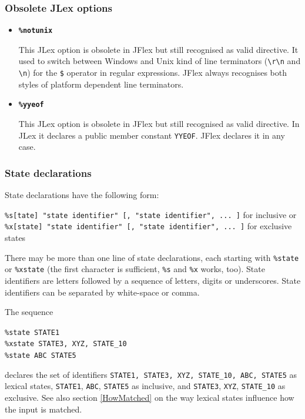 \documentclass[11pt]{scrartcl}
\begin{document}
\subsubsection{Obsolete JLex options}\label{Obsolete}
\begin{itemize}
\item
{\bfseries \texttt{\%notunix}}

This JLex option is obsolete in JFlex but still recognised as valid directive.
It used to switch between Windows and Unix kind of line terminators (\verb+\r\n+
and \verb+\n+) for the \texttt{\$} operator in regular expressions. JFlex
always recognises both styles of platform dependent line terminators.
 
\item
{\bfseries \texttt{\%yyeof}}

This JLex option is obsolete in JFlex but still recognised as valid directive.
In JLex it declares a public member constant \texttt{YYEOF}. JFlex declares it in any case.
\end{itemize}

\subsubsection{State declarations}\label{StateDecl}
State declarations have the following form:

\texttt{\%s[tate] "state identifier" [, "state identifier", ... ]} for inclusive or\\
\texttt{\%x[state] "state identifier" [, "state identifier", ... ]} for exclusive states

There may be more than one line of state declarations, each starting with
\texttt{\%state} or \texttt{\%xstate} (the first character is sufficient,
\texttt{\%s} and \texttt{\%x} works, too). State identifiers are letters followed 
by a sequence of letters, digits or underscores. State identifiers can be separated 
by white-space or comma.

The sequence

\texttt{\%state STATE1}\\
\texttt{\%xstate STATE3, XYZ, STATE\_10}\\
\texttt{\%state ABC STATE5}

declares the set of identifiers \texttt{{STATE1, STATE3, XYZ,
    STATE\_10, ABC, STATE5}} as lexical states, \texttt{STATE1}, \texttt{ABC}, \texttt{STATE5}
as inclusive, and \texttt{STATE3}, \texttt{XYZ}, \texttt{STATE\_10} as exclusive. 
See also section
\ref{HowMatched} on the way lexical states influence how the input is
matched.
 
\end{document}
